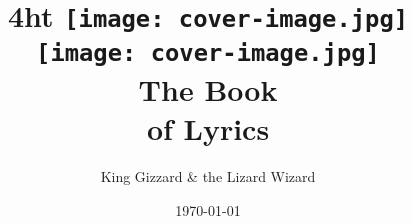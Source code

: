 \documentclass[a4paper,12pt,titlepage]{report}
\title{%
    \centering%
    \iftex4ht%
        \texttt{[image: cover-image.jpg]}\\[1em]%
    \else
        \texttt{[image: cover-image.jpg]}\\[2em]%
    \fi
    The Book\\%
    {\relscale{0.8} of Lyrics}%
}
\author{King Gizzard \& the Lizard Wizard}
\date{\today}
\renewcommand{\underline}[1]{%
    \uline{\phantom{#1}}%
    \llap{\contour{white}{#1}}%
}
\begin{document}
\newcommand{\epubnewpage}{%
    \iftex4ht\newpage\fi%
}

\newcommand{\lindex}[1]{%
  \lowercase{\def\temp{#1}}%
  \expandafter\index\expandafter{\temp}%
}

\newcommand{\album}[2][]{%
    \ifthenelse{\equal {#1}{}}%
    {\chapter[#2]{#2}}%
    {\chapter[#1]{#2}}%
    \nopagebreak%
}
\newcommand{\artwork}[1]{%
    \vspace*{-2em}%
    \nopagebreak%
    \begin{center}%
		\iftex4ht%
			\texttt{[image: artworks/\#1]}%
		\else%
			\texttt{[image: artworks/\#1]}%
		\fi%
    \end{center}%
    \nopagebreak%
}
\newcommand{\released}[3]{%
    \vspace*{-1em}%
    \nopagebreak%
    \begin{center}%
        \textit{Released: \shortdate\formatdate{#3}{#2}{#1}}%
    \end{center}%
    \iftex4ht%
        \epubnewpage%
    \fi%
    \nopagebreak%
}
\newcommand{\song}[2][]{%
    \ifthenelse{\equal {#1}{}}{%
        \section[#2]{#2}\index[songs]{#2}%
    }{%
        \section[#1]{#2}\index[songs]{#1}%
    }%
    \nopagebreak%
}
\newcommand{\writtenby}[1]{%
    \nopagebreak%
    \textscale{0.8}{[Written by: \emph{#1}]}\newline%
    \nopagebreak%
}
\newcommand{\note}[1]{%
    \nopagebreak%
    \emph{#1}\newline%
    \nopagebreak%
}
\newcommand{\word}[2][]{%
	\ifthenelse{\equal {#1}{}}%
	{\lindex{#2}}%
	{\lindex{#1}}%
	\underline{#2}%
}

\maketitle
\clearpage
\end{document}
